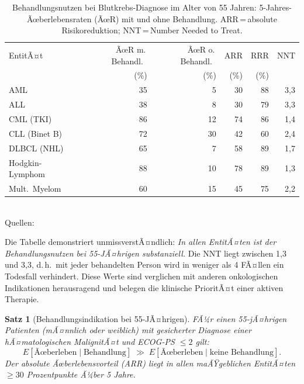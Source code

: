 ﻿\documentclass[12pt,a4paper]{article}
\newtheorem{theorem}{Satz}[section]
\theoremstyle{definition}
\begin{document}
\begin{table}[ht]
\centering
\caption{Behandlungsnutzen bei Blutkrebs-Diagnose im Alter von 55 Jahren:
5-Jahres-Ãœberlebensraten (ÃœR) mit und ohne Behandlung.
ARR\,=\,absolute Risikoreduktion; NNT\,=\,Number Needed to Treat.}
\label{tab:benefit55}
\begin{tabular}{@{}lrrrrr@{}}
\toprule
EntitÃ¤t & ÃœR m.\,Behandl.\ & ÃœR o.\,Behandl.\ & ARR & RRR & NNT \\
        & (\%) & (\%) & (\%) & (\%) & \\
\midrule
AML           & 35   & 5  & 30   & 88  & 3,3  \\
ALL           & 38   & 8  & 30   & 79  & 3,3  \\
CML (TKI)     & 86   & 12 & 74   & 86  & 1,4  \\
CLL (Binet B) & 72   & 30 & 42   & 60  & 2,4  \\
DLBCL (NHL)   & 65   & 7  & 58   & 89  & 1,7  \\
Hodgkin-Lymphom   & 88   & 10 & 78   & 89  & 1,3  \\
Mult.\ Myelom & 60   & 15 & 45   & 75  & 2,2  \\
\bottomrule
\end{tabular}
\smallskip\\
\footnotesize Quellen: \cite{dohner2017,kantarjian2021,hochhaus2017,zenz2014,coiffier2002,kumar2017,siegel2023,burnett2007,appelbaum2006}
\end{table}

Die Tabelle demonstriert unmissverstÃ¤ndlich: \emph{In allen EntitÃ¤ten ist der
Behandlungsnutzen bei 55-JÃ¤hrigen substanziell.} Die NNT liegt zwischen 1,3 und 3,3,
d.\,h.\ mit jeder behandelten Person wird in weniger als 4 FÃ¤llen ein Todesfall
verhindert. Diese Werte sind verglichen mit anderen onkologischen Indikationen
herausragend und belegen die klinische PrioritÃ¤t einer aktiven Therapie.

\begin{theorem}[Behandlungsindikation bei 55-JÃ¤hrigen]
  \label{thm:indikation}
  FÃ¼r einen 55-jÃ¤hrigen Patienten (mÃ¤nnlich oder weiblich) mit gesicherter Diagnose
  einer hÃ¤matologischen MalignitÃ¤t und ECOG-PS $\leq 2$ gilt:
  \begin{equation}
    E\left[\text{Ãœberleben} \mid \text{Behandlung}\right]
    \;\gg\;
    E\left[\text{Ãœberleben} \mid \text{keine Behandlung}\right].
    \label{eq:survival_benefit}
  \end{equation}
  Der absolute Ãœberlebensvorteil (ARR) liegt in allen maÃŸgeblichen EntitÃ¤ten
  $\geq 30$ Prozentpunkte Ã¼ber 5 Jahre.
\end{theorem}
\end{document}
